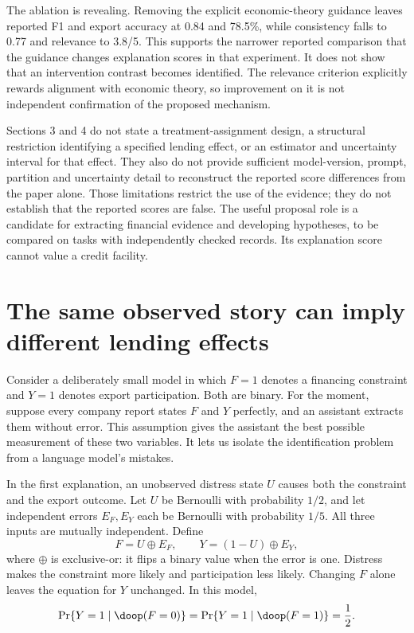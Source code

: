 The ablation is revealing. Removing the explicit economic-theory guidance
leaves reported F1 and export accuracy at 0.84 and 78.5\%, while consistency
falls to 0.77 and relevance to 3.8/5. This supports the narrower reported
comparison that the guidance changes explanation scores in that experiment.
It does not show that an intervention contrast becomes identified. The
relevance criterion explicitly rewards alignment with economic theory, so
improvement on it is not independent confirmation of the proposed mechanism.
\citep[Sections 4.2.2--4.6; Tables 1--2]{closure30li}

Sections 3 and 4 do not state a treatment-assignment design, a structural
restriction identifying a specified lending effect, or an estimator and
uncertainty interval for that effect. They also do not provide sufficient
model-version, prompt, partition and uncertainty detail to reconstruct the
reported score differences from the paper alone. Those limitations restrict
the use of the evidence; they do not establish that the reported scores are
false. The useful proposal role is a candidate for extracting financial
evidence and developing hypotheses, to be compared on tasks with independently
checked records. Its explanation score cannot value a credit facility.

\section{The same observed story can imply different lending effects}

Consider a deliberately small model in which $F=1$ denotes a financing
constraint and $Y=1$ denotes export participation. Both are binary. For the
moment, suppose every company report states $F$ and $Y$ perfectly, and an
assistant extracts them without error. This assumption gives the assistant
the best possible measurement of these two variables. It lets us isolate the
identification problem from a language model's mistakes.

In the first explanation, an unobserved distress state $U$ causes both the
constraint and the export outcome. Let $U$ be Bernoulli with probability
$1/2$, and let independent errors $E_F,E_Y$ each be Bernoulli with probability
$1/5$. All three inputs are mutually independent. Define
\begin{equation}
 F=U\mathbin{\oplus}E_F,\qquad
 Y=(1-U)\mathbin{\oplus}E_Y,
 \label{closure30:confounded}
\end{equation}
where $\oplus$ is exclusive-or: it flips a binary value when the error is one.
Distress makes the constraint more likely and participation less likely.
Changing $F$ alone leaves the equation for $Y$ unchanged. In this model,
\begin{equation}
 \Pr\{Y=1\mid\doop(F=0)\}
 =\Pr\{Y=1\mid\doop(F=1)\}=\frac12.
 \label{closure30:noeffect}
\end{equation}

